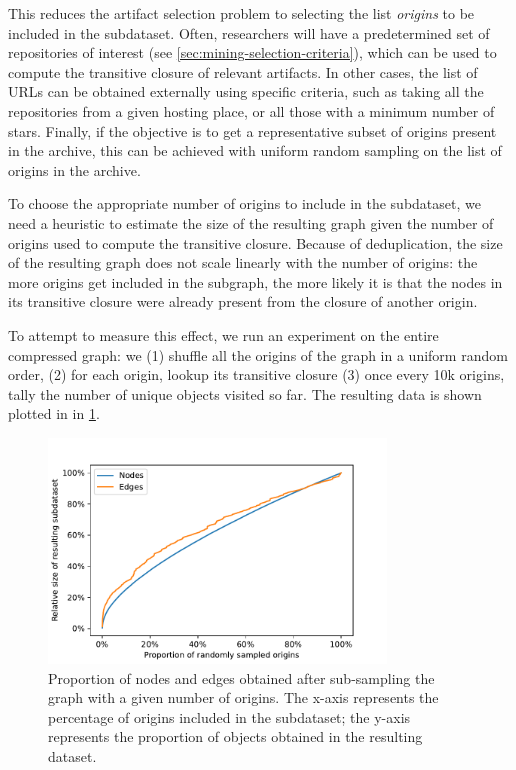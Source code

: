 This reduces the artifact selection problem to selecting the list
\emph{origins} to be included in the subdataset.
Often, researchers will have a predetermined set of repositories of interest
(see \cref{sec:mining-selection-criteria}), which can be used to compute the
transitive closure of relevant artifacts. In other cases, the list of URLs
can be obtained externally using specific criteria, such as taking all the
repositories from a given hosting place, or all those with a minimum number of
stars. Finally, if the objective is to get a representative subset of origins
present in the archive, this can be achieved with uniform random sampling on
the list of origins in the archive.

To choose the appropriate number of origins to include in the subdataset, we
need a heuristic to estimate the size of the resulting graph given the number
of origins used to compute the transitive closure. Because of deduplication,
the size of the resulting graph does not scale linearly with the number of
origins: the more origins get included in the subgraph, the more likely it is
that the nodes in its transitive closure were already present from the closure
of another origin.

To attempt to measure this effect, we run an experiment on the entire
compressed graph: we (1) shuffle all the origins of the graph in a uniform
random order, (2) for each origin, lookup its transitive closure (3) once every
10k origins, tally the number of unique objects visited so far. The resulting
data is shown plotted in in \cref{fig:subdataset-size-function}.

\begin{figure}
    \centering
    \includegraphics[width=0.8\textwidth]{img/graph-exploitation/subdataset_size_function}
    \caption{Proportion of nodes and edges obtained after sub-sampling the
        graph with a given number of origins. The x-axis represents the
        percentage of origins included in the subdataset; the y-axis represents
        the proportion of objects obtained in the resulting dataset.}%
    \label{fig:subdataset-size-function}
\end{figure}


